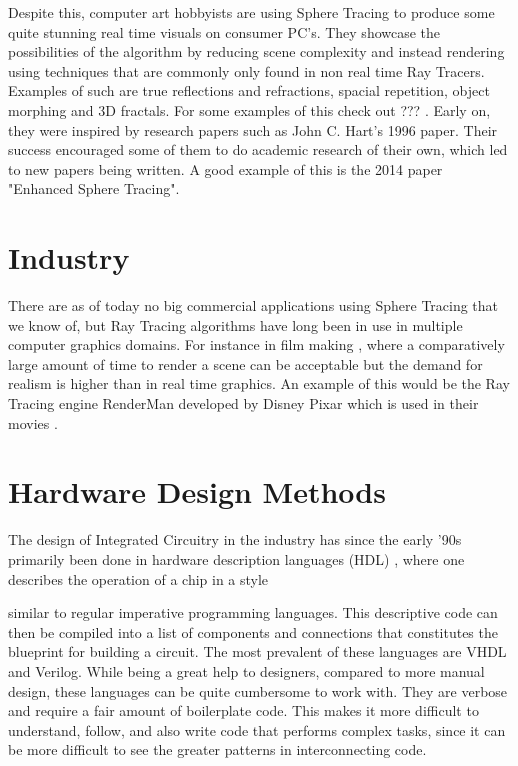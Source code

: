 		Despite this, computer art hobbyists are using Sphere Tracing to produce
		some quite stunning real time visuals on consumer PC's. They showcase 
		the possibilities of the algorithm by reducing scene complexity and 
		instead rendering using techniques that are commonly only found in non 
		real time Ray Tracers. Examples of such are true reflections and 
		refractions, spacial repetition, object morphing and 3D fractals. 
		For some examples of this check out ???  \cite{InigoQuilez}.
		Early on, they were inspired by research papers such as John C. Hart's 
		1996 paper\cite{Hart1996}. Their success encouraged some of them to do 
		academic research of their own, which led to new papers being written. A 
		good example of this is the 2014 paper "Enhanced Sphere 
		Tracing"\cite{Korndorfer2014}.

		\section{ Industry }		
		There are as of today no big commercial applications using Sphere
		Tracing that we know of, but Ray Tracing algorithms have long been in 
		use in multiple computer graphics domains. For instance in film making 
		\cite{TODO}, where a comparatively large amount of time to render a 
		scene can be acceptable but the demand for realism is higher than in 
		real time graphics. An example of this would be the Ray Tracing engine 
		RenderMan developed by Disney Pixar which is used in their movies \cite{TODO}.
	
	\section{ Hardware Design Methods } 
	
		The design of Integrated Circuitry in the industry has since the early
		'90s primarily been done in hardware description languages (HDL)
		\cite{Chen2012}, where one describes the operation of a chip in a style
		
		similar to regular imperative programming languages. This descriptive
		code can then be compiled into a list of components and connections
		that constitutes the blueprint for building a circuit. The most
		prevalent of these languages are VHDL and Verilog\cite{TODO}. While
		being a great help to designers, compared to more manual design, these
		languages can be quite cumbersome to work with. They are verbose and 
		require a fair amount of boilerplate code. This makes it more difficult
		to understand, follow, and also write code that performs complex tasks, 
		since it can be more difficult to see the greater patterns in 
		interconnecting code.
		

